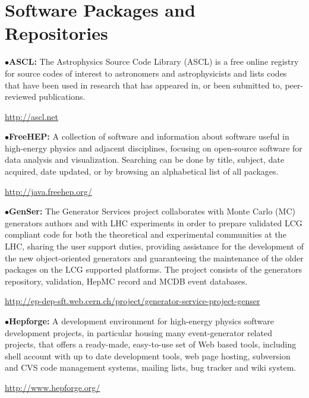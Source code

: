 \section{Software Packages and Repositories}  %

\medskip
{}
\medskip

\item{$\bullet$}{\bf ASCL:}
The Astrophysics Source Code Library (ASCL) is a free online registry for source codes of interest to astronomers and astrophysicists and lists codes that have been used in research that has appeared in, or been submitted to, peer-reviewed publications.
	\item{}\qquad\url{http://ascl.net}

\medskip

\item{$\bullet$}{\bf FreeHEP:}
A collection of software and information about software useful in high-energy physics and adjacent disciplines, focusing on open-source software for data analysis and visualization. Searching can be done by title, subject, date acquired, date updated, or by browsing an alphabetical list of all packages.
	\item{}\qquad\url{http://java.freehep.org/}

\medskip

\item{$\bullet$}{\bf GenSer:} The Generator Services project collaborates with Monte Carlo (MC)
generators authors and with LHC experiments in order to prepare validated LCG compliant code for
both the theoretical and experimental communities at the LHC, sharing the user support duties,
providing assistance for the development of the new object-oriented generators and guaranteeing
the maintenance of the older packages on the LCG supported platforms. The project consists of the
generators repository, validation, HepMC record and MCDB event databases.
	\item{}\quad\url{http://ep-dep-sft.web.cern.ch/project/generator-service-project-genser}

\medskip

\item{$\bullet$}{\bf Hepforge:}
A development environment for high-energy physics software development projects,
in particular housing many event-generator related projects, that offers a ready-made,
easy-to-use set of Web based tools, including shell account with up to date development
tools, web page hosting, subversion and CVS code management systems, mailing lists, bug tracker and wiki system.
	\item{}\qquad\url{http://www.hepforge.org/}

